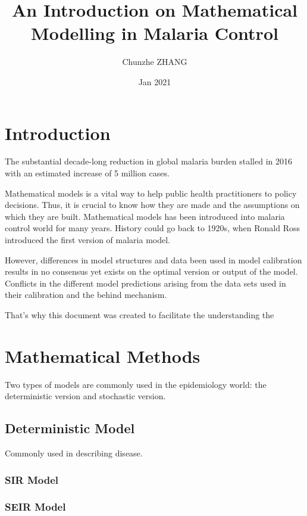 \documentclass[a4paper, 12pt, twoside]{article}
\title{An Introduction on Mathematical Modelling in Malaria Control}
\author{Chunzhe ZHANG}
\date{Jan 2021}
\begin{document}
\begin{titlepage}
\maketitle
\end{titlepage}

\tableofcontents

\section{Introduction}
The substantial decade-long reduction in global malaria burden stalled in 2016 with an estimated increase of 5 million cases.

Mathematical models is a vital way to help public health practitioners to policy decisions. Thus, it is crucial to know how they are made and the assumptions on which they are built. Mathematical models has been introduced into malaria control world for many years. History could go back to 1920s, when Ronald Ross introduced the first version of malaria model.

However, differences in model structures and data been used in model calibration results in no consensus yet exists on the optimal version or output of the model. Conflicts in the different model predictions arising from the data sets used in their calibration and the behind mechanism. 

That's why this document was created to facilitate the understanding the 

\section{Mathematical Methods}

Two types of models are commonly used in the epidemiology world: the deterministic version and stochastic version.

\subsection{Deterministic Model}

Commonly used in describing disease. 


\subsubsection{SIR Model}

\subsubsection{SEIR Model}
\end{document}
